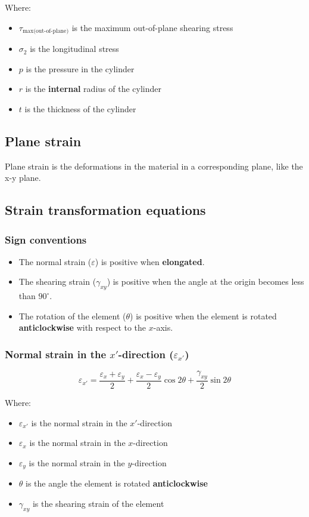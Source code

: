 \documentclass[11pt]{article}
\begin{document}
Where:
\begin{itemize}
\item \(\tau_{\text{max(out-of-plane)}}\) is the maximum out-of-plane shearing stress
\item \(\sigma_2\) is the longitudinal stress
\item \(p\) is the pressure in the cylinder
\item \(r\) is the \textbf{internal} radius of the cylinder
\item \(t\) is the thickness of the cylinder
\end{itemize}
\subsection{Plane strain}
\label{sec:orgd3de411}
Plane strain is the deformations in the material in a corresponding plane, like the x-y plane.
\subsection{Strain transformation equations}
\label{sec:org7f5b5f1}

\subsubsection{Sign conventions}
\label{sec:org6d748bb}
\begin{itemize}
\item The normal strain (\(\varepsilon\)) is positive when \textbf{elongated}.
\item The shearing strain (\(\gamma_{xy}\)) is positive when the angle at the origin becomes less than \(90^{\circ}\).
\item The rotation of the element (\(\theta\)) is positive when the element is rotated \textbf{anticlockwise} with respect to the \(x\)-axis.
\end{itemize}
\subsubsection{Normal strain in the \(x'\)-direction (\(\varepsilon_{x'}\))}
\label{sec:orgb12d9aa}
\[\varepsilon_{x'} = \frac{\varepsilon_x + \varepsilon_y}{2} + \frac{\varepsilon_x - \varepsilon_y}{2} \cos 2 \theta + \frac{\gamma_{xy}}{2} \sin 2 \theta\]

Where:
\begin{itemize}
\item \(\varepsilon_{x'}\) is the normal strain in the \(x'\)-direction
\item \(\varepsilon_{x}\) is the normal strain in the \(x\)-direction
\item \(\varepsilon_{y}\) is the normal strain in the \(y\)-direction
\item \(\theta\) is the angle the element is rotated \textbf{anticlockwise}
\item \(\gamma_{xy}\) is the shearing strain of the element
\end{itemize}
\end{document}
